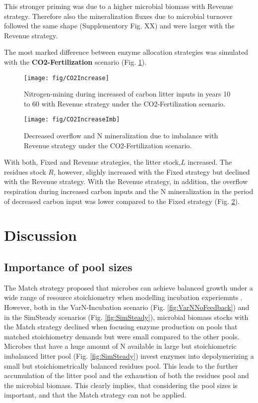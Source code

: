 This stronger priming was due to a higher microbial biomass with Revenue
strategy. Therefore also the mineralization fluxes due to microbial turnover
followed the same shape (Supplementory Fig. XX) and were larger
with the Revenue strategy.

The most marked difference between enzyme allocation strategies was simulated
with the \textbf{CO2-Fertilization} scenario (Fig. \ref{fig:CO2Increase}).

\begin{figure}[t]
\vspace*{2mm}
\begin{center}
\texttt{[image: fig/CO2Increase]}
\end{center}
\caption{Nitrogen-mining during increased of carbon litter inputs in years 10
to 60 with Revenue strategy under the CO2-Fertilization scenario.
\label{fig:CO2Increase}}
\end{figure}

\begin{figure}[t] \vspace*{2mm}
\begin{center}
\texttt{[image: fig/CO2IncreaseImb]}
\end{center}
\caption{Decreased overflow and N mineralization due to imbalance with Revenue 
strategy under the CO2-Fertilization scenario.
\label{fig:CO2IncreaseImb}}
\end{figure}

With both, Fixed and Revenue strategies, the litter stock,$L$ increased. The
residues stock $R$, however, slighly increased with the Fixed strategy but
declined with the Revenue strategy. With the Revenue strategy, in addition, the
overflow respiration during increased carbon inputs and the N mineralization
in the period of decreased carbon input was lower compared to the Fixed
strategy (Fig. \ref{fig:CO2IncreaseImb}).


\section{Discussion}
\subsection{Importance of pool sizes}
The Match strategy proposed that microbes can achieve balanced growth under a
wide range of resource stoichiometry when modelling incubation experiemnts
.
However, both in the VarN-Incubation scenario (Fig.
\ref{fig:VarNNoFeedback}) and in the SimSteady scenarios (Fig.
\ref{fig:SimSteady}), microbial biomass stocks with the Match strategy declined
when focusing enzyme production on pools that matched stoichiometry demands but
were small compared to the other pools.
Microbes that have a huge amount of N available in large but stoichiometric
imbalanced litter pool (Fig. \ref{fig:SimSteady}) invest enzymes into
depolymerizing a small but stoichiometrically balanced residues pool. This leads
to the further accumulation of the litter pool and the exhaustion of both the
residues pool and the microbial biomass. This clearly implies, that considering
the pool sizes is important, and that the Match strategy can not be applied.

